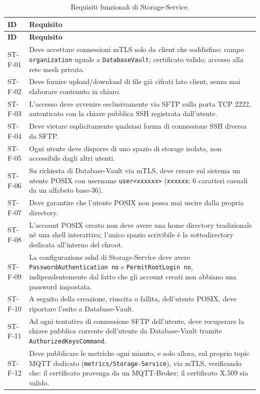 \begin{longtable}{p{2.6cm} p{\dimexpr\linewidth-2.6cm-4\tabcolsep\relax}}
\caption{Requisiti funzionali di Storage-Service.} \\
\hline
\textbf{ID} & \textbf{Requisito} \\
\hline
\endfirsthead
\hline
\textbf{ID} & \textbf{Requisito} \\
\hline
\endhead
\hline
\endfoot
\hline
\endlastfoot
ST-F-01 & Deve accettare connessioni mTLS solo da client che soddisfino: campo \texttt{organization} uguale a \texttt{DatabaseVault}; certificato valido; accesso alla rete mesh privata. \\
ST-F-02 & Deve fornire upload/download di file già cifrati lato client, senza mai elaborare contenuto in chiaro. \\
ST-F-03 & L'accesso deve avvenire esclusivamente via SFTP sulla porta TCP 2222, autenticato con la chiave pubblica SSH registrata dall'utente. \\
ST-F-04 & Deve vietare esplicitamente qualsiasi forma di connessione SSH diversa da SFTP. \\
ST-F-05 & Ogni utente deve disporre di uno spazio di storage isolato, non accessibile dagli altri utenti. \\
ST-F-06 & Su richiesta di Database-Vault via mTLS, deve creare sul sistema un utente POSIX con username \texttt{user<xxxxxx>} (\texttt{xxxxxx}: 6 caratteri casuali da un alfabeto base-36). \\
ST-F-07 & Deve garantire che l'utente POSIX non possa mai uscire dalla propria directory. \\
ST-F-08 & L'account POSIX creato non deve avere una home directory tradizionale né una shell interattiva; l'unico spazio scrivibile è la sottodirectory dedicata all'interno del chroot. \\
ST-F-09 & La configurazione sshd di Storage-Service deve avere \texttt{PasswordAuthentication no} e \texttt{PermitRootLogin no}, indipendentemente dal fatto che gli account creati non abbiano una password impostata. \\
ST-F-10 & A seguito della creazione, riuscita o fallita, dell'utente POSIX, deve riportare l'esito a Database-Vault. \\
ST-F-11 & Ad ogni tentativo di connessione SFTP dell'utente, deve recuperare la chiave pubblica corrente dell'utente da Database-Vault tramite \texttt{AuthorizedKeysCommand}. \\
ST-F-12 & Deve pubblicare le metriche ogni minuto, e solo allora, sul proprio topic MQTT dedicato (\texttt{metrics/Storage-Service}), via mTLS, verificando che: il certificato provenga da un MQTT-Broker; il certificato X.509 sia valido. \\

\end{longtable}
